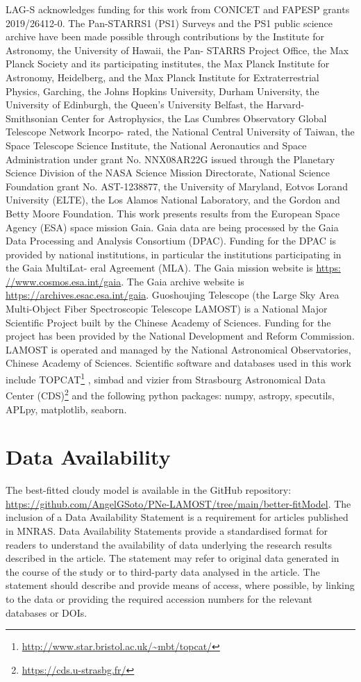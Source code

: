 \documentclass[fleqn,usenatbib]{mnras}
\begin{document}
LAG-S acknowledges funding for this work
from CONICET and FAPESP grants 2019/26412-0.
The Pan-STARRS1 (PS1) Surveys and the PS1 public science
archive have been made possible through contributions by the
Institute for Astronomy, the University of Hawaii, the Pan-
STARRS Project Office, the Max Planck Society and its
participating institutes, the Max Planck Institute for Astronomy,
Heidelberg, and the Max Planck Institute for Extraterrestrial
Physics, Garching, the Johns Hopkins University, Durham
University, the University of Edinburgh, the Queen’s University
Belfast, the Harvard-Smithsonian Center for Astrophysics, the
Las Cumbres Observatory Global Telescope Network Incorpo-
rated, the National Central University of Taiwan, the Space
Telescope Science Institute, the National Aeronautics and Space
Administration under grant No. NNX08AR22G issued through
the Planetary Science Division of the NASA Science Mission
Directorate, National Science Foundation grant No. AST-1238877,
the University of Maryland, Eotvos Lorand University
(ELTE), the Los Alamos National Laboratory, and the Gordon
and Betty Moore Foundation.
This work presents results from the European Space Agency
(ESA) space mission Gaia. Gaia data are being processed by
the Gaia Data Processing and Analysis Consortium (DPAC).
Funding for the DPAC is provided by national institutions, in
particular the institutions participating in the Gaia MultiLat-
eral Agreement (MLA). The Gaia mission website is \url{https:
//www.cosmos.esa.int/gaia}. The Gaia archive website is
\url{https://archives.esac.esa.int/gaia}.
Guoshoujing Telescope (the Large Sky Area Multi-Object Fiber Spectroscopic
Telescope LAMOST) is a National Major Scientific Project built by the Chinese
Academy of Sciences. Funding for the project has been provided by the National
Development and Reform Commission. LAMOST is operated and managed by the
National Astronomical Observatories, Chinese Academy of Sciences.
Scientific software and databases used in this work include 
TOPCAT\footnote{\url{http://www.star.bristol.ac.uk/~mbt/topcat/}}
\citep{Taylor:2005}, simbad and vizier from Strasbourg Astronomical
Data Center (CDS)\footnote{\url{https://cds.u-strasbg.fr/}} 
and the following  python packages: numpy, astropy,
specutils, APLpy, matplotlib, seaborn.
\section*{Data Availability}

The best-fitted {\sc cloudy} model is available in the GitHub repository:
\url{https://github.com/AngelGSoto/PNe-LAMOST/tree/main/better-fitModel}. 
The inclusion of a Data Availability Statement is a requirement for articles published in MNRAS.
Data Availability Statements provide a standardised format for readers to understand the
availability of data underlying the research results described in the article. The statement may
refer to original data generated in the course of the study or to third-party data analysed in the article.
The statement should describe and provide means of access, where possible, by linking to the
data or providing the required accession numbers for the relevant databases or DOIs.
\end{document}

